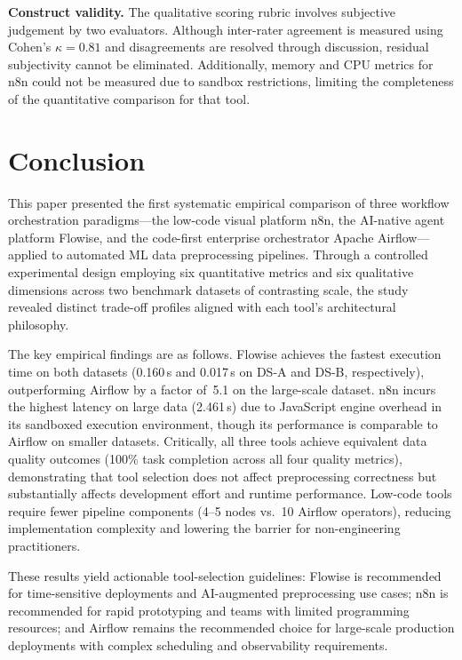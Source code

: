 \documentclass[journal]{IEEEtran}
\begin{document}
\textbf{Construct validity.} The qualitative scoring rubric involves
subjective judgement by two evaluators. Although inter-rater agreement
is measured using Cohen's $\kappa = 0.81$ and disagreements are resolved
through discussion, residual subjectivity cannot be eliminated.
Additionally, memory and CPU metrics for n8n could not be measured due
to sandbox restrictions, limiting the completeness of the quantitative
comparison for that tool.


\section{Conclusion}
\label{sec:conclusion}

This paper presented the first systematic empirical comparison of three
workflow orchestration paradigms---the low-code visual platform n8n, the
AI-native agent platform Flowise, and the code-first enterprise
orchestrator Apache Airflow---applied to automated ML data preprocessing
pipelines. Through a controlled experimental design employing six
quantitative metrics and six qualitative dimensions across two benchmark
datasets of contrasting scale, the study revealed distinct trade-off
profiles aligned with each tool's architectural philosophy.

The key empirical findings are as follows. Flowise achieves the fastest
execution time on both datasets (0.160\,s and 0.017\,s on DS-A and
DS-B, respectively), outperforming Airflow by a factor of~5.1 on the
large-scale dataset. n8n incurs the highest latency on large data
(2.461\,s) due to JavaScript engine overhead in its sandboxed execution
environment, though its performance is comparable to Airflow on smaller
datasets. Critically, all three tools achieve equivalent data quality
outcomes (100\% task completion across all four quality metrics),
demonstrating that tool selection does not affect preprocessing
correctness but substantially affects development effort and runtime
performance. Low-code tools require fewer pipeline components (4--5
nodes vs.\ 10 Airflow operators), reducing implementation complexity
and lowering the barrier for non-engineering practitioners.

These results yield actionable tool-selection guidelines: Flowise is
recommended for time-sensitive deployments and AI-augmented preprocessing
use cases; n8n is recommended for rapid prototyping and teams with
limited programming resources; and Airflow remains the recommended
choice for large-scale production deployments with complex scheduling
and observability requirements.
\end{document}
